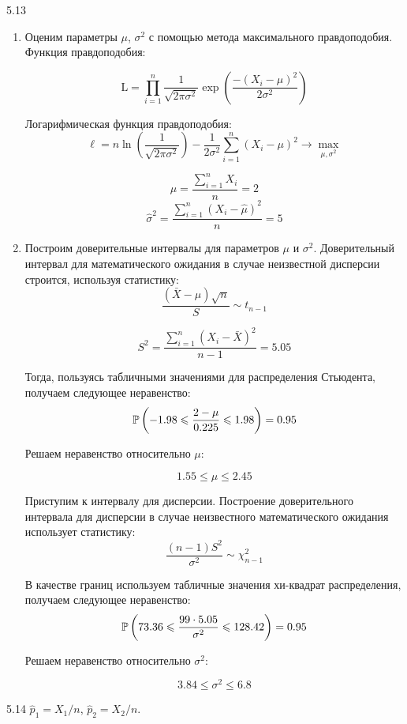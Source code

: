 \protect \hypertarget {soln:5.13}{}
\begin{solution}{{5.13}}
\begin{enumerate}
\item Оценим параметры $\mu$, $\sigma^2$ с помощью метода максимального правдоподобия. Функция правдоподобия:

\[\text{L} = \prod_{i=1}^{n} \frac{1}{\sqrt{2\pi\sigma^2}}\exp\left( \frac{- \left( X_i-\mu\right)^2}{2\sigma^2}\right)\]

Логарифмическая функция правдоподобия:
\[\ell = n \ln\left(\frac{1}{\sqrt{2\pi\sigma^2}}\right) - \frac{1}{2\sigma^2}\sum_{i=1}^{n}\left(X_i-\mu\right)^2 \to \max_{\mu,\sigma^2}\]

\[\hat{\mu} = \frac{\sum_{i=1}^{n}X_i}{n} = 2\]
\[\hat{\sigma}^2 = \frac{\sum_{i=1}^{n}\left(X_i-\hat{\mu}\right)^2}{n} = 5\]

\item Построим доверительные интервалы для параметров $\mu$ и $\sigma^2$. Доверительный интервал для математического ожидания в случае неизвестной дисперсии строится, используя статистику:
\[\frac{\left(\bar{X} - \mu\right)\sqrt{n}}{S} \sim t_{n-1}\]

\[S^2 = \frac{\sum_{i=1}^{n}\left( X_i - \bar{X}\right)^2 }{n-1} = 5.05\]

Тогда, пользуясь табличными значениями для распределения Стьюдента, получаем следующее неравенство:
\[\P\left( -1.98 \leqslant \frac{2-\mu}{0.225} \leqslant 1.98 \right) = 0.95 \]

Решаем неравенство относительно $\mu$:

\[1.55 \leqslant \mu \leqslant 2.45\]


Приступим к интервалу для дисперсии. Построение доверительного интервала для дисперсии в случае неизвестного математического ожидания использует статистику:
\[\frac{\left(n-1\right)S^2}{\sigma^2} \sim \chi^2_{n-1}\]

В качестве границ используем табличные значения хи-квадрат распределения, получаем следующее неравенство:
\[\P\left( 73.36 \leqslant \frac{99\cdot5.05}{\sigma^2} \leqslant 128.42 \right) = 0.95 \]

Решаем неравенство относительно $\sigma^2$:

\[3.84 \leqslant \sigma^2 \leqslant 6.8\]
\end{enumerate}
\end{solution}
\protect \hypertarget {soln:5.14}{}
\begin{solution}{{5.14}}
$\hat{p}_1=X_1/n$, $\hat{p}_2=X_2/n$.
\end{solution}
